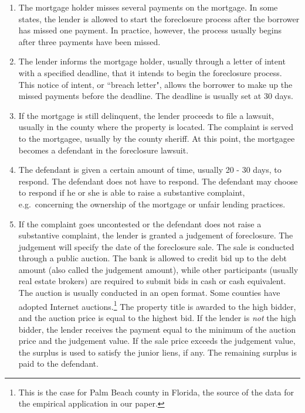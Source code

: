 \documentclass[11pt,twopage]{article}
\begin{document}
\begin{enumerate}
\item The mortgage holder misses several payments on the mortgage. In some states, the lender is allowed to start the foreclosure process after the borrower has missed one payment. In practice, however, the process usually begins after three payments have been missed.
\item The lender informs the mortgage holder, usually through a letter of intent with a specified deadline, that it intends to begin the foreclosure process. This notice of intent, or ``breach letter", allows the borrower to make up the missed payments before the deadline. The deadline is usually set at 30 days.
\item If the mortgage is still delinquent, the lender proceeds to file a lawsuit, usually in the county where the property is located. The complaint is served to the mortgagee, usually by the county sheriff. At this point, the mortgagee becomes a defendant in the foreclosure lawsuit.
\item The defendant is given a certain amount of time, usually 20 - 30 days, to respond. The defendant does not have to  respond. The defendant may choose to respond if he or she is able to raise a substantive complaint, e.g.\ concerning the ownership of the mortgage or unfair lending practices.
\item If the complaint goes uncontested or the defendant does not raise a substantive complaint, the lender is granted a judgement of foreclosure. The judgement will specify the date of the foreclosure sale. The sale is conducted through a public auction. The bank is allowed to credit bid up to the debt amount (also called the judgement amount), while other participants (usually real estate brokers) are required to submit bids in cash or cash equivalent. The auction is usually conducted in an open format. Some counties have adopted Internet auctions.\footnote{This is the case for Palm Beach county in Florida, the source of the data for the empirical application in our paper.} The property title is awarded to the high bidder, and the auction price is equal to the highest bid. If the lender is \emph{not} the high bidder, the lender receives the payment equal to the minimum of the auction price and the judgement value. If the sale price exceeds the judgement value, the surplus is used to satisfy the junior liens, if any. The remaining surplus is paid to the defendant. 
\end{enumerate}
\end{document}
